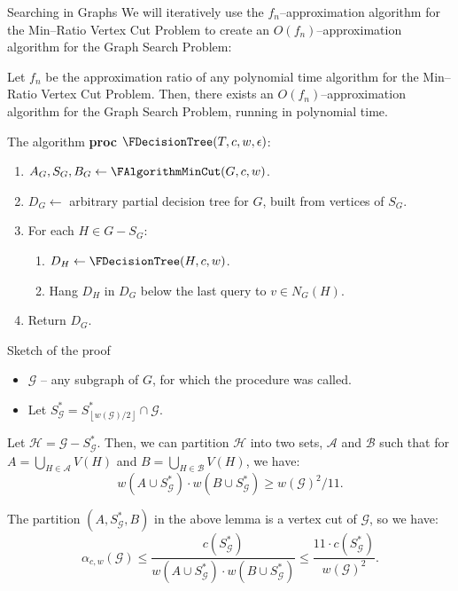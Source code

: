 \documentclass{beamer}
\newcommand{\br}[1]{\mathopen{}\left( #1 \right)}
\newcommand{\fl}[1]{\mathopen{}\left\lfloor #1 \right\rfloor}
\begin{document}
\begin{frame}{Searching in Graphs}
We will iteratively use the $f_n$–approximation algorithm for the Min–Ratio Vertex Cut Problem to create an $O\br{f_n}$–approximation algorithm for the Graph Search Problem:
\pause
\begin{theorem}
    Let $f_n$ be the approximation ratio of any polynomial time algorithm for the Min–Ratio Vertex Cut Problem. Then, there exists an $O\br{f_n}$–approximation algorithm for the Graph Search Problem, running in polynomial time.
\end{theorem}
    
\end{frame}

\begin{frame}{The algorithm}
\textbf{proc} $\FDecisionTree\br{T,c,w,\epsilon}$:
\begin{enumerate}
    \item $A_G,S_G, B_G\gets\FAlgorithmMinCut\br{G, c, w}$.
    \item $D_G\gets$ arbitrary partial decision tree for $G$, built from vertices of $S_G$.
    \item For each $H\in G-S_G$:
    \begin{enumerate}
        \item $D_H\gets \FDecisionTree\br{H, c, w}$.
        \item Hang $D_H$ in $D_G$ below the last query to $v\in N_G\br{H}$.
    \end{enumerate}
    \item Return $D_G$.
\end{enumerate}
\end{frame}

\begin{frame}{Sketch of the proof}

    \begin{itemize}
        \item $\mathcal{G}$ – any subgraph of $G$, for which the procedure was called.
        \pause
        \item Let $S_{\mathcal{G}}^*=S_{\fl{w\br{\mathcal{G}}/2}}^*\cap \mathcal{G}$.
    \end{itemize}
        \pause
        \begin{lemma}\label{lambda_lemma}
            Let $\mathcal{H}=\mathcal{G}-S_{\mathcal{G}}^*$. Then, we can partition $\mathcal{H}$ into two sets, $\mathcal{A}$ and $\mathcal{B}$ such that for $A=\bigcup_{H\in\mathcal{A}}V\br{H}$ and $B=\bigcup_{H\in\mathcal{B}}V\br{H}$, we have:
            $$w\br{A\cup S_{\mathcal{G}}^*}\cdot w\br{B\cup S_{\mathcal{G}}^*}\geq w\br{\mathcal{G}}^2/11.$$
        \end{lemma}
        \pause
        The partition $\br{A,S_{\mathcal{G}}^*,B}$ in the above lemma is a vertex cut of $\mathcal{G}$, so we have:
                $$\alpha_{c,w}\br{\mathcal{G}}\leq \frac{c\br{S_{\mathcal{G}}^*}}{w\br{A\cup S_{\mathcal{G}}^*}\cdot w\br{B\cup S_{\mathcal{G}}^*}}\leq \frac{11 \cdot c\br{S_{\mathcal{G}}^*}}{w\br{\mathcal{G}}^2}.
                $$
    \end{frame}
\end{document}
